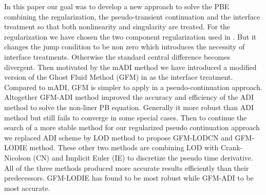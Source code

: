 In this paper our goal was to develop a new approach to solve the PBE combining the regularization, the pseudo-transient continuation and the interface treatment so that both nonlinearity and singularity are treated. For the regularization we have chosen  the two component regularization used in \cite{Geng2017a}. But it changes the jump condition to be non zero which introduces the necessity of interface treatments. Otherwise the standard central difference becomes divergent. Then motivated by the mADI method we have introduced a modified version of the Ghost Fluid Method (GFM)  in \cite{Fedkiw1999} as the interface treatment. Compared to mADI, GFM is simpler to apply in a pseudo-continuation approach. Altogether GFM-ADI method improved the accuracy and efficiency of the ADI method to solve the non-liner PB equation. Generally it more robust than ADI method but still fails to converge in some special cases. Then to continue the search of a more stable method for our regularized pseudo continuation approach we replaced ADI scheme  by LOD method to propose GFM-LODCN and GFM-LODIE method. These other two methods are combining LOD  with Crank-Nicolson (CN) and Implicit Euler (IE) to discretize the pseudo time derivative. All of the three methods produced more accurate results efficiently than their predecessors. GFM-LODIE has found to be most  robust while GFM-ADI to be most accurate.